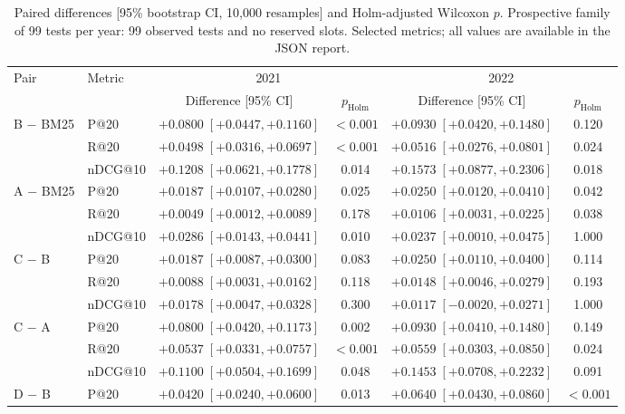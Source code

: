 \documentclass{article}
\begin{document}
\begin{table}[t]
  \caption{Paired differences [95\% bootstrap CI, 10{,}000 resamples] and Holm-adjusted Wilcoxon $p$. Prospective family of 99 tests per year: 99 observed tests and no reserved slots. Selected metrics; all values are available in the JSON report.}
  \label{tab:diff-exp1}
  \centering
  \small
  \setlength{\tabcolsep}{2.5pt}
  \begin{tabular}{llcccc}
    \toprule
    Pair & Metric & \multicolumn{2}{c}{2021} & \multicolumn{2}{c}{2022} \\
    & & Difference [95\% CI] & $p_{\mathrm{Holm}}$ & Difference [95\% CI] & $p_{\mathrm{Holm}}$ \\
    \midrule
    B $-$ BM25 & P@20 & $+0.0800\;[+0.0447, +0.1160]$ & $<0.001$ & $+0.0930\;[+0.0420, +0.1480]$ & 0.120 \\
     & R@20 & $+0.0498\;[+0.0316, +0.0697]$ & $<0.001$ & $+0.0516\;[+0.0276, +0.0801]$ & 0.024 \\
     & nDCG@10 & $+0.1208\;[+0.0621, +0.1778]$ & 0.014 & $+0.1573\;[+0.0877, +0.2306]$ & 0.018 \\
    \midrule
    A $-$ BM25 & P@20 & $+0.0187\;[+0.0107, +0.0280]$ & 0.025 & $+0.0250\;[+0.0120, +0.0410]$ & 0.042 \\
     & R@20 & $+0.0049\;[+0.0012, +0.0089]$ & 0.178 & $+0.0106\;[+0.0031, +0.0225]$ & 0.038 \\
     & nDCG@10 & $+0.0286\;[+0.0143, +0.0441]$ & 0.010 & $+0.0237\;[+0.0010, +0.0475]$ & 1.000 \\
    \midrule
    C $-$ B & P@20 & $+0.0187\;[+0.0087, +0.0300]$ & 0.083 & $+0.0250\;[+0.0110, +0.0400]$ & 0.114 \\
     & R@20 & $+0.0088\;[+0.0031, +0.0162]$ & 0.118 & $+0.0148\;[+0.0046, +0.0279]$ & 0.193 \\
     & nDCG@10 & $+0.0178\;[+0.0047, +0.0328]$ & 0.300 & $+0.0117\;[-0.0020, +0.0271]$ & 1.000 \\
    \midrule
    C $-$ A & P@20 & $+0.0800\;[+0.0420, +0.1173]$ & 0.002 & $+0.0930\;[+0.0410, +0.1480]$ & 0.149 \\
     & R@20 & $+0.0537\;[+0.0331, +0.0757]$ & $<0.001$ & $+0.0559\;[+0.0303, +0.0850]$ & 0.024 \\
     & nDCG@10 & $+0.1100\;[+0.0504, +0.1699]$ & 0.048 & $+0.1453\;[+0.0708, +0.2232]$ & 0.091 \\
    \midrule
    D $-$ B & P@20 & $+0.0420\;[+0.0240, +0.0600]$ & 0.013 & $+0.0640\;[+0.0430, +0.0860]$ & $<0.001$ \\

\end{tabular}
\end{table}
\end{document}
